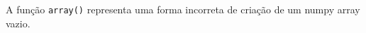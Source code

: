 \documentclass[12pt,varwidth=16cm,border=1pt]{standalone}
\begin{document}
A função \verb+array()+ representa uma forma incorreta de criação de um numpy array vazio.

\questiomtrue
\end{document}
